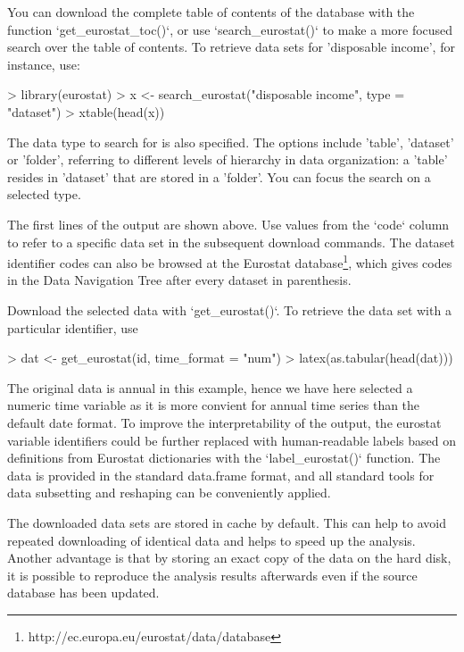 You can download the complete table of contents of the database with the function `get\_eurostat\_toc()`, or use `search\_eurostat()` to make a more focused search over the table of contents. To retrieve data sets for 'disposable income', for instance, use:


\begin{Schunk}
\begin{Sinput}
> library(eurostat)
> x <- search_eurostat("disposable income", type = "dataset")
> xtable(head(x))
\end{Sinput}
\end{Schunk}

The data type to search for is also specified. The options include 'table', 'dataset' or 'folder', referring to different levels of hierarchy in data organization: a 'table' resides in 'dataset' that are stored in a 'folder'. You can focus the search on a selected type.

The first lines of the output are shown above. Use values from the `code` column to refer to a specific data set in the subsequent download commands. The dataset identifier codes can also be browsed at the Eurostat
database\footnote{http://ec.europa.eu/eurostat/data/database}, which gives
codes in the Data Navigation Tree after every dataset in parenthesis.

Download the selected data with `get\_eurostat()`. To retrieve the data set with a particular identifier, use 

\begin{example}
\begin{Schunk}
\begin{Sinput}
> dat <- get_eurostat(id, time_format = "num")
> latex(as.tabular(head(dat)))
\end{Sinput}
\end{Schunk}
\end{example}

The original data is annual in this example, hence we have here
selected a numeric time variable as it is more convient for annual
time series than the default date format. To improve the
interpretability of the output, the eurostat variable identifiers
could be further replaced with human-readable labels based on
definitions from Eurostat dictionaries with the `label\_eurostat()`
function. The data is provided in the standard data.frame format, and
all standard tools for data subsetting and reshaping can be
conveniently applied.

The downloaded data sets are stored in cache by default. This can help
to avoid repeated downloading of identical data and helps to speed up
the analysis. Another advantage is that by storing an exact copy of
the data on the hard disk, it is possible to reproduce the analysis
results afterwards even if the source database has been updated.

